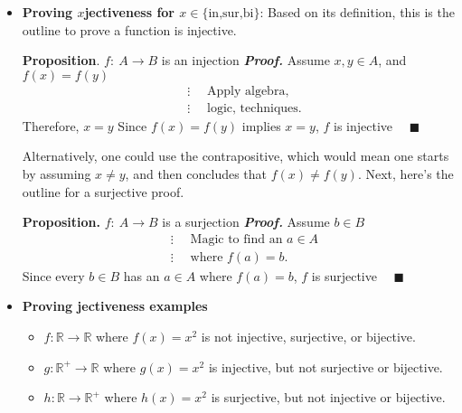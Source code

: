 \documentclass{report}
\begin{document}
\begin{itemize}
        \item \textbf{Proving $x$jectiveness for $x\in \{\text{in,sur,bi}\}$}: Based on its definition, this is the outline to prove a function is injective.
            \bigbreak \noindent 
            \begin{mdframed}
                \textbf{Proposition}. $f:\ A \to B$ is an injection
                \bigbreak \noindent 
                \textbf{\textit{Proof.}} Assume $x,y \in A $, and $f(x) = f(y)$
                \begin{align*}
                    &\vdots \quad \text{ Apply algebra}, \\
                     &\vdots \quad \text{ logic, techniques}
                .\end{align*}
                Therefore, $x=y $
                \bigbreak \noindent 
                Since $f(x) =f(y)$ implies $x=y$, $f$ is injective $\quad \blacksquare $
            \end{mdframed}
            \bigbreak \noindent 
            Alternatively, one could use the contrapositive, which would mean one starts by assuming $x \ne y$, and then concludes that $f(x) \ne f(y)$.
            \bigbreak \noindent 
            Next, here’s the outline for a surjective proof.
            \begin{mdframed}
                \textbf{Proposition.} $f:\ A \to B$ is a surjection
                \bigbreak \noindent 
                \textbf{\textit{Proof.}} Assume $b\in B $
                \begin{align*}
                    &\vdots \quad \text{ Magic  to find an $a\in A$}\\
                    &\vdots \quad \text{ where $f(a) = b $}
                .\end{align*}
                Since every $b\in B$ has an $a\in A$ where $f(a) = b $, $f$ is surjective $\quad \blacksquare $
            \end{mdframed}
        \item \textbf{Proving jectiveness examples}
            \begin{itemize}
                \item \( f : \mathbb{R} \to \mathbb{R} \) where \( f(x) = x^2 \) is not injective, surjective, or bijective.
                \item \( g : \mathbb{R}^+ \to \mathbb{R} \) where \( g(x) = x^2 \) is injective, but not surjective or bijective.
                \item \( h : \mathbb{R} \to \mathbb{R}^+ \) where \( h(x) = x^2 \) is surjective, but not injective or bijective.

\end{itemize}
\end{itemize}
\end{document}
